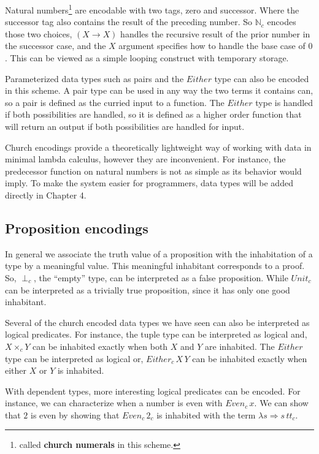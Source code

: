 Natural numbers\footnote{called \textbf{church numerals} in this scheme.} are encodable with two tags, zero and successor.
Where the successor tag also contains the result of the preceding number.
So $\mathbb{N}_{c}$ encodes those two choices, $(X\rightarrow X)$ handles the recursive result of the prior number in the successor case, and the $X$ argument specifies how to handle the base case of $0$.
This can be viewed as a simple looping construct with temporary storage.

Parameterized data types such as pairs and the $Either$ type can also be encoded in this scheme.
A pair type can be used in any way the two terms it contains can, so a pair is defined as the curried input to a function.
The $Either$ type is handled if both possibilities are handled, so it is defined as a higher order function that will return an output if both possibilities are handled for input.


Church encodings provide a theoretically lightweight way of working with data in minimal lambda calculus, however they are inconvenient.
For instance, the predecessor function on natural numbers is not as simple as its behavior would imply.
To make the system easier for programmers, data types will be added directly in Chapter 4.

\subsection{Proposition encodings}

In general we associate the truth value of a proposition with the inhabitation of a type by a meaningful value.
This meaningful inhabitant corresponds to a proof.
So, $\perp_{c}$, the ``empty'' type, can be interpreted as a false proposition.
While $Unit_{c}$ can be interpreted as a trivially true proposition, since it has only one good inhabitant.

Several of the church encoded data types we have seen can also be interpreted as logical predicates.
For instance, the tuple type can be interpreted as logical and, $X\times_{c}Y$ can be inhabited exactly when both $X$ and $Y$ are inhabited.
The $Either$ type can be interpreted as logical or, $Either_{c}\,X\,Y$ can be inhabited exactly when either $X$ or $Y$ is inhabited.

With dependent types, more interesting logical predicates can be encoded.
For instance, we can characterize when a number is even with $Even_{c}\,x$.
We can show that $2$ is even by showing that $Even_{c}\,2_{c}$ is inhabited with the term $\lambda s\Rightarrow s\,tt_{c}$.

